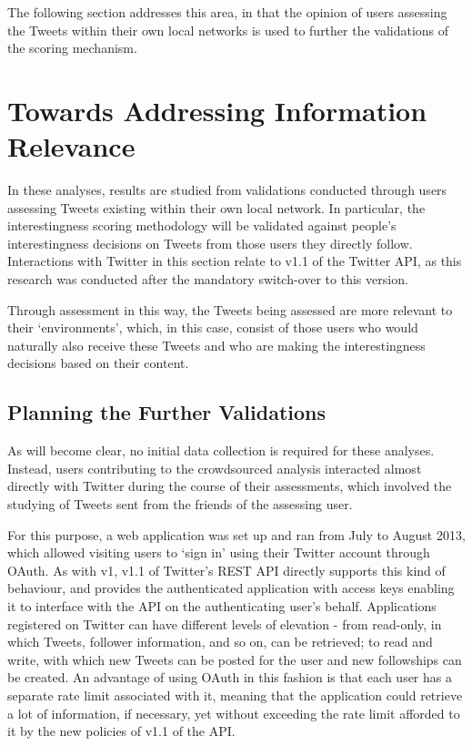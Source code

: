 The following section addresses this area, in that the opinion of users assessing the Tweets within their own local networks is used to further the validations of the scoring mechanism. 


\section{Towards Addressing Information Relevance}
In these analyses, results are studied from validations conducted through users assessing Tweets existing within their own local network. In particular, the interestingness scoring methodology will be validated against people's interestingness decisions on Tweets from those users they directly follow. Interactions with Twitter in this section relate to v1.1 of the Twitter API, as this research was conducted after the mandatory switch-over to this version.

Through assessment in this way, the Tweets being assessed are more relevant to their `environments', which, in this case, consist of those users who would naturally also receive these Tweets and who are making the interestingness decisions based on their content.


\subsection{Planning the Further Validations}
As will become clear, no initial data collection is required for these analyses. Instead, users contributing to the crowdsourced analysis interacted almost directly with Twitter during the course of their assessments, which involved the studying of Tweets sent from the friends of the assessing user.

For this purpose, a web application was set up and ran from July to August 2013, which allowed visiting users to `sign in' using their Twitter account through OAuth. As with v1, v1.1 of Twitter's REST API directly supports this kind of behaviour, and provides the authenticated application with access keys enabling it to interface with the API on the authenticating user's behalf. Applications registered on Twitter can have different levels of elevation - from read-only, in which Tweets, follower information, and so on, can be retrieved; to read and write, with which new Tweets can be posted for the user and new followships can be created. An advantage of using OAuth in this fashion is that each user has a separate rate limit associated with it, meaning that the application could retrieve a lot of information, if necessary, yet without exceeding the rate limit afforded to it by the new policies of v1.1 of the API.

